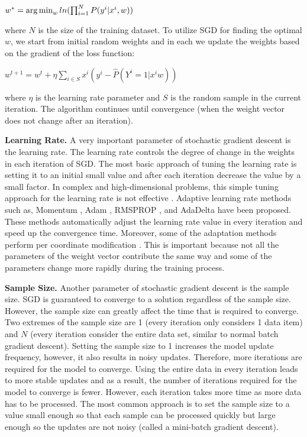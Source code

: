 \begin{center}
$w^* = \operatorname*{arg\,min}_w ln(\prod_{i=1}^{N} P(y^i | x^i, w))$
\end{center}

where $N$ is the size of the training dataset.
To utilize SGD for finding the optimal $w$, we start from initial random weights and in each we update the weights based on the gradient of the loss function:

\begin{center}
${w}^{t+1} = {w}^t + \eta \sum_{i \in S} x^i (y^i - \hat{P}(Y^i = 1 | x^i w))$
\end{center}

where $\eta$ is the learning rate parameter and $S$ is the random sample in the current iteration.
The algorithm continues until convergence (when the weight vector does not change after an iteration).

\textbf{Learning Rate.}
A very important parameter of stochastic gradient descent is the learning rate.
The learning rate controls the degree of change in the weights in each iteration of SGD.
The most basic approach of tuning the learning rate is setting it to an initial small value and after each iteration decrease the value by a small factor.
In complex and high-dimensional problems, this simple tuning approach for the learning rate is not effective \cite{schaul2013no}. 
Adaptive learning rate methods such as, Momentum \cite{qian1999momentum}, Adam \cite{kingma2014adam}, RMSPROP \cite{tieleman2012lecture}, and AdaDelta \cite{zeiler2012adaptive} have been proposed.
These methods automatically adjust the learning rate value in every iteration and speed up the convergence time.
Moreover, some of the adaptation methods perform per coordinate modification \cite{schaul2013no, tieleman2012lecture, zeiler2012adaptive}. 
This is important because not all the parameters of the weight vector contribute the same way and some of the parameters change more rapidly during the training process.

\textbf{Sample Size.}
Another parameter of stochastic gradient descent is the sample size.
SGD is guaranteed to converge to a solution regardless of the sample size.
However, the sample size can greatly affect the time that is required to converge.
Two extremes of the sample size are 1 (every iteration only considers 1 data item) and $N$ (every iteration consider the entire data set, similar to normal batch gradient descent).
Setting the sample size to 1 increases the model update frequency, however, it also results in noisy updates.
Therefore, more iterations are required for the model to converge.
Using the entire data in every iteration leads to more stable updates and as a result, the number of iterations required for the model to converge is fewer.
However, each iteration takes more time as more data has to be processed.
The most common approach is to set the sample size to a value small enough so that each sample can be processed quickly but large enough so the updates are not noisy (called a mini-batch gradient descent).


